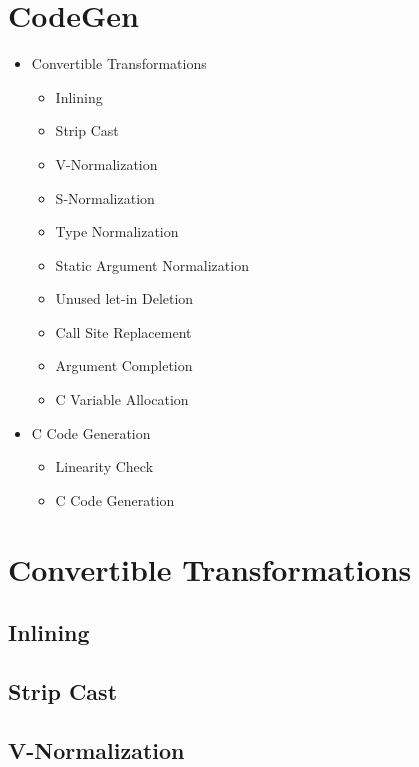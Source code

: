 \documentclass[a4paper,fleqn]{article}
\begin{document}
\section{CodeGen}\label{sec:codegen}

\begin{itemize}
\item Convertible Transformations
  \begin{itemize}
  \item Inlining
  \item Strip Cast
  \item V-Normalization
  \item S-Normalization
  \item Type Normalization
  \item Static Argument Normalization
  \item Unused let-in Deletion
  \item Call Site Replacement
  \item Argument Completion
  \item C Variable Allocation
  \end{itemize}
\item C Code Generation
  \begin{itemize}
  \item Linearity Check
  \item C Code Generation
  \end{itemize}
\end{itemize}

\section{Convertible Transformations}\label{sec:convertible-transformations}

\subsection{Inlining}\label{sec:inlining}
\subsection{Strip Cast}\label{sec:strip-cast}
\subsection{V-Normalization}\label{sec:v-normalization}
\end{document}
